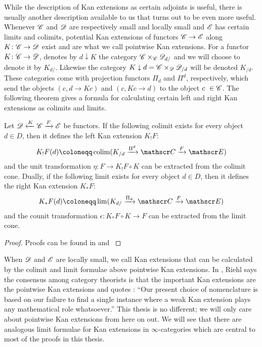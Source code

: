 \documentclass[../../thesis.tex]{subfiles}
\begin{document}
While the description of Kan extensions as certain adjoints is useful, there is usually another description available to us that turns out to be even more useful.
Whenever $\mathscr{C}$ and $\mathscr{D}$ are respectively small and locally small and $\mathscr{E}$ has certain limits and colimits, potential Kan extensions of functors $\mathscr{C} \to \mathscr{E}$ along $K\colon \mathscr{C} \to \mathscr{D}$ exist and are what we call pointwise Kan extensions.
For a functor $K\colon \mathscr{C} \to \mathscr{D}$, \cite{MacLane} denotes by $d \downarrow K$ the category $\mathscr{C} \times_{\mathscr{C}}\mathscr{D}_{d/}$ and we will choose to denote it by $K_{d/}$.
Likewise the category $K \downarrow d = \mathscr{C} \times_{\mathscr{D}}\mathscr{D}_{/d}$ will be denoted $K_{/d}$.
These categories come with projection functors $\Pi_d$ and $\Pi^d$, respectively, which send the objects $(c,d\to Kc)$ and $(c,Kc \to d)$ to the object $c \in \C$.
The following theorem gives a formula for calculating certain left and right Kan extensions as colimits and limits.
\begin{theorem}\label{ptwiseKan}
    Let $\mathscr{D} \xleftarrow{K} \mathscr{C} \xrightarrow{F} \mathscr{E}$ be functors.
    If the following colimit exists for every object $d\in D$, then it defines the left Kan extension $K_!F$:
    \[
        K_!F(d) \coloneqq \colim(K_{/d} \xrightarrow{\Pi^d}\C\xrightarrow{F}\E)
    \]
    and the unit transformation $\eta\colon F \to K_!F\circ K$ can be extracted from the colimit cone.
    Dually, if the following limit exists for every object $d\in D$, then it defines the right Kan extension $K_*F$:
    \[
        K_*F(d) \coloneqq \lim(K_{d/} \xrightarrow{\Pi_d}\C \xrightarrow{F} \E)
    \]
    and the counit transformation $\epsilon\colon K_*F\circ K \to F$ can be extracted from the limit cone.
\end{theorem}
\begin{proof}
    Proofs can be found in \cite[Theorem 6.2.1.]{CatContext} and \cite[Theorem X.3.1.]{MacLane}
\end{proof}
When $\mathscr{D}$ and $\mathscr{E}$ are locally small, we call Kan extensions that can be calculated by the colimit and limit formulae above pointwise Kan extensions.
In \cite{CatContext}, Riehl says the consensus among category theorists is that the important Kan extensions are the pointwise Kan extensions and quotes \cite[§4]{Kelly}:
``Our present choice of nomenclature is based on our failure to find a single instance where a weak Kan extension plays any mathematical role whatsoever.''
This thesis is no different; we will only care about pointwise Kan extensions from here on out.
We will see that there are analogous limit formulae for Kan extensions in $\infty$-categories which are central to most of the proofs in this thesis.
\end{document}
